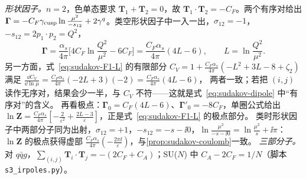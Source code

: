 \begin{example}[两部分子情形与色守恒]\label{ex:sudakov-dipole-twoparton}
\emph{形状因子。}$n=2$，色单态要求 $\mathbf T_1+\mathbf T_2=0$，故 $\mathbf T_1\cdot\mathbf T_2=-C_F$。两个有序对给出
$\boldsymbol\Gamma=-C_F\gamma_{\rm cusp}\ln\frac{\mu^2}{-s_{12}}+2\gamma^q$。类空形状因子中一入一出，$\sigma_{12}=-1$，$-s_{12}=2p_1\cdot p_2=Q^2$，
\[
\boldsymbol\Gamma=\frac{\alpha_s}{4\pi}\Big[4C_F\ln\frac{Q^2}{\mu^2}-6C_F\Big]=\frac{C_F\alpha_s}{4\pi}(4L-6),\qquad L=\ln\frac{Q^2}{\mu^2}.
\]
另一方面，式~\eqref{eq:sudakov-F1-L} 的有限部分 $C_V=1+\frac{C_F\alpha_s}{4\pi}(-L^2+3L-8+\zeta_2)$ 满足 $\frac{\dd C_V}{\dd\ln\mu}=\frac{C_F\alpha_s}{4\pi}(-2L+3)(-2)=\frac{C_F\alpha_s}{4\pi}(4L-6)$，
两者一致；若把 $(i,j)$ 读作无序对，结果会少一半，与 $C_V$ 不符——这就是式~\eqref{eq:sudakov-dipole} 中“有序对”的含义。%
再看极点：$\boldsymbol\Gamma_0=C_F(4L-6)$、$\boldsymbol\Gamma'_0=-8C_F$，单圈公式给出 $\ln\mathbf Z=\frac{C_F\alpha_s}{4\pi}[-\frac2{\varepsilon^2}+\frac{2L-3}\varepsilon]$，正是式~\eqref{eq:sudakov-F1-L} 的极点部分。
类时形状因子中两部分子同为出射，$\sigma_{12}=+1$，$-s_{12}=-s-\ii0$，$\ln\frac{\mu^2}{-s-\ii0}=\ln\frac{\mu^2}{s}+\ii\pi$：$\ln\mathbf Z$ 的极点获得虚部 $\frac{C_F\alpha_s}{4\pi}(-\frac{2\pi\ii}\varepsilon)$，与\cref{prop:sudakov-coulomb}一致。
\emph{三部分子。}对 $q\bar qg$，$\sum_{(i,j)}\mathbf T_i\cdot\mathbf T_j=-(2C_F+C_A)$；SU($N$) 中 $C_A-2C_F=1/N$（脚本 \texttt{s3\_irpoles.py}）。
\end{example}

